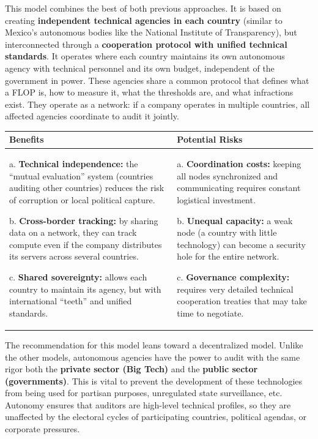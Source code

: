 This model combines the best of both previous approaches. It is based on creating \textbf{independent technical agencies in each country} (similar to Mexico's autonomous bodies like the National Institute of Transparency), but interconnected through a \textbf{cooperation protocol with unified technical standards}. It operates where each country maintains its own autonomous agency with technical personnel and its own budget, independent of the government in power. These agencies share a common protocol that defines what a FLOP is, how to measure it, what the thresholds are, and what infractions exist. They operate as a network: if a company operates in multiple countries, all affected agencies coordinate to audit it jointly.

\begin{center}
\begin{tabular}{|p{5cm}|p{5cm}|}
\hline
\textbf{Benefits} & \textbf{Potential Risks} \\
\hline
a. \textbf{Technical independence:} the ``mutual evaluation'' system (countries auditing other countries) reduces the risk of corruption or local political capture.

\vspace{0.2cm}
b. \textbf{Cross-border tracking:} by sharing data on a network, they can track compute even if the company distributes its servers across several countries.

\vspace{0.2cm}
c. \textbf{Shared sovereignty:} allows each country to maintain its agency, but with international ``teeth'' and unified standards. 
& 
a. \textbf{Coordination costs:} keeping all nodes synchronized and communicating requires constant logistical investment.

\vspace{0.2cm}
b. \textbf{Unequal capacity:} a weak node (a country with little technology) can become a security hole for the entire network.

\vspace{0.2cm}
c. \textbf{Governance complexity:} requires very detailed technical cooperation treaties that may take time to negotiate. \\
\hline
\end{tabular}
\end{center}

The recommendation for this model leans toward a decentralized model. Unlike the other models, autonomous agencies have the power to audit with the same rigor both the \textbf{private sector (Big Tech)} and the \textbf{public sector (governments)}. This is vital to prevent the development of these technologies from being used for partisan purposes, unregulated state surveillance, etc. Autonomy ensures that auditors are high-level technical profiles, so they are unaffected by the electoral cycles of participating countries, political agendas, or corporate pressures.

